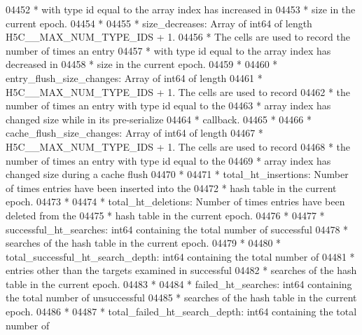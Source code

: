 \begin{DoxyCode}
04452 \textcolor{comment}{ *      with type id equal to the array index has increased in}
04453 \textcolor{comment}{ *      size in the current epoch.}
04454 \textcolor{comment}{ *}
04455 \textcolor{comment}{ * size\_decreases:  Array of int64 of length H5C\_\_MAX\_NUM\_TYPE\_IDS + 1.}
04456 \textcolor{comment}{ *      The cells are used to record the number of times an entry}
04457 \textcolor{comment}{ *      with type id equal to the array index has decreased in}
04458 \textcolor{comment}{ *      size in the current epoch.}
04459 \textcolor{comment}{ *}
04460 \textcolor{comment}{ * entry\_flush\_size\_changes:  Array of int64 of length}
04461 \textcolor{comment}{ *      H5C\_\_MAX\_NUM\_TYPE\_IDS + 1.  The cells are used to record}
04462 \textcolor{comment}{ *      the number of times an entry with type id equal to the}
04463 \textcolor{comment}{ *      array index has changed size while in its pre-serialize }
04464 \textcolor{comment}{ *      callback.}
04465 \textcolor{comment}{ *}
04466 \textcolor{comment}{ * cache\_flush\_size\_changes:  Array of int64 of length}
04467 \textcolor{comment}{ *      H5C\_\_MAX\_NUM\_TYPE\_IDS + 1.  The cells are used to record}
04468 \textcolor{comment}{ *      the number of times an entry with type id equal to the}
04469 \textcolor{comment}{ *      array index has changed size during a cache flush}
04470 \textcolor{comment}{ *}
04471 \textcolor{comment}{ * total\_ht\_insertions: Number of times entries have been inserted into the}
04472 \textcolor{comment}{ *      hash table in the current epoch.}
04473 \textcolor{comment}{ *}
04474 \textcolor{comment}{ * total\_ht\_deletions: Number of times entries have been deleted from the}
04475 \textcolor{comment}{ *              hash table in the current epoch.}
04476 \textcolor{comment}{ *}
04477 \textcolor{comment}{ * successful\_ht\_searches: int64 containing the total number of successful}
04478 \textcolor{comment}{ *      searches of the hash table in the current epoch.}
04479 \textcolor{comment}{ *}
04480 \textcolor{comment}{ * total\_successful\_ht\_search\_depth: int64 containing the total number of}
04481 \textcolor{comment}{ *      entries other than the targets examined in successful}
04482 \textcolor{comment}{ *      searches of the hash table in the current epoch.}
04483 \textcolor{comment}{ *}
04484 \textcolor{comment}{ * failed\_ht\_searches: int64 containing the total number of unsuccessful}
04485 \textcolor{comment}{ *              searches of the hash table in the current epoch.}
04486 \textcolor{comment}{ *}
04487 \textcolor{comment}{ * total\_failed\_ht\_search\_depth: int64 containing the total number of}

\end{DoxyCode}
